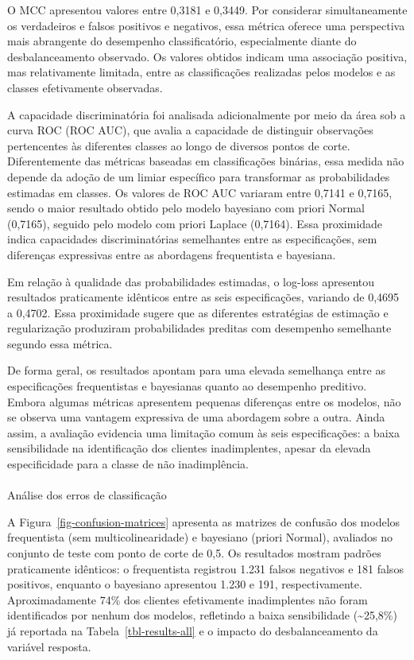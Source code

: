 \documentclass[
  brazilian,
  12pt,
  letterpaper,
  DIV=11,
  numbers=noendperiod]{scrartcl}
\makeatletter
\let\oldparagraph\paragraph
\renewcommand{\paragraph}{
    \@ifstar
      \xxxParagraphStar
      \xxxParagraphNoStar
  }
\newcommand{\xxxParagraphStar}[1]{\oldparagraph*{#1}\mbox{}}
\newcommand{\xxxParagraphNoStar}[1]{\oldparagraph{#1}\mbox{}}
\makeatother
\begin{document}
O MCC apresentou valores entre 0,3181 e 0,3449. Por considerar
simultaneamente os verdadeiros e falsos positivos e negativos, essa
métrica oferece uma perspectiva mais abrangente do desempenho
classificatório, especialmente diante do desbalanceamento observado. Os
valores obtidos indicam uma associação positiva, mas relativamente
limitada, entre as classificações realizadas pelos modelos e as classes
efetivamente observadas.

A capacidade discriminatória foi analisada adicionalmente por meio da
área sob a curva ROC (ROC AUC), que avalia a capacidade de distinguir
observações pertencentes às diferentes classes ao longo de diversos
pontos de corte. Diferentemente das métricas baseadas em classificações
binárias, essa medida não depende da adoção de um limiar específico para
transformar as probabilidades estimadas em classes. Os valores de ROC
AUC variaram entre 0,7141 e 0,7165, sendo o maior resultado obtido pelo
modelo bayesiano com priori Normal (0,7165), seguido pelo modelo com
priori Laplace (0,7164). Essa proximidade indica capacidades
discriminatórias semelhantes entre as especificações, sem diferenças
expressivas entre as abordagens frequentista e bayesiana.

Em relação à qualidade das probabilidades estimadas, o log-loss
apresentou resultados praticamente idênticos entre as seis
especificações, variando de 0,4695 a 0,4702. Essa proximidade sugere que
as diferentes estratégias de estimação e regularização produziram
probabilidades preditas com desempenho semelhante segundo essa métrica.

De forma geral, os resultados apontam para uma elevada semelhança entre
as especificações frequentistas e bayesianas quanto ao desempenho
preditivo. Embora algumas métricas apresentem pequenas diferenças entre
os modelos, não se observa uma vantagem expressiva de uma abordagem
sobre a outra. Ainda assim, a avaliação evidencia uma limitação comum às
seis especificações: a baixa sensibilidade na identificação dos clientes
inadimplentes, apesar da elevada especificidade para a classe de não
inadimplência.

\paragraph{Análise dos erros de
classificação}\label{sec-erros-classificacao}

A Figura~\ref{fig-confusion-matrices} apresenta as matrizes de confusão
dos modelos frequentista (sem multicolinearidade) e bayesiano (priori
Normal), avaliados no conjunto de teste com ponto de corte de 0,5. Os
resultados mostram padrões praticamente idênticos: o frequentista
registrou 1.231 falsos negativos e 181 falsos positivos, enquanto o
bayesiano apresentou 1.230 e 191, respectivamente. Aproximadamente 74\%
dos clientes efetivamente inadimplentes não foram identificados por
nenhum dos modelos, refletindo a baixa sensibilidade
(\textasciitilde25,8\%) já reportada na Tabela~\ref{tbl-results-all} e o
impacto do desbalanceamento da variável resposta.
\end{document}
